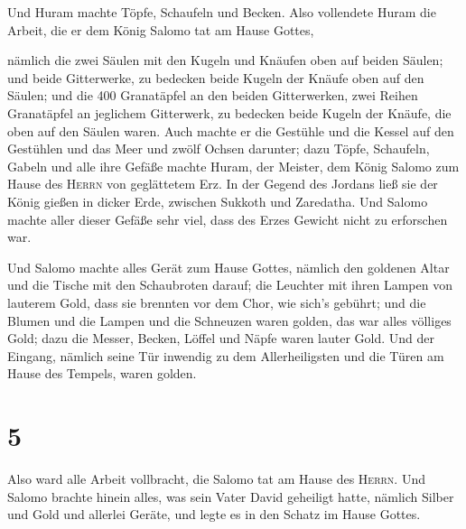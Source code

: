  Und Huram machte Töpfe, Schaufeln und Becken. Also
vollendete Huram die Arbeit, die er dem König Salomo tat am Hause
Gottes,

 nämlich die zwei Säulen mit den Kugeln und Knäufen oben
auf beiden Säulen; und beide Gitterwerke, zu bedecken beide Kugeln der
Knäufe oben auf den Säulen;  und die 400 Granatäpfel an
den beiden Gitterwerken, zwei Reihen Granatäpfel an jeglichem
Gitterwerk, zu bedecken beide Kugeln der Knäufe, die oben auf den Säulen
waren.  Auch machte er die Gestühle und die Kessel auf
den Gestühlen  und das Meer und zwölf Ochsen darunter;
 dazu Töpfe, Schaufeln, Gabeln und alle ihre Gefäße
machte Huram, der Meister, dem König Salomo zum Hause des \textsc{Herrn}
von geglättetem Erz.  In der Gegend des Jordans ließ sie
der König gießen in dicker Erde, zwischen Sukkoth und Zaredatha.
 Und Salomo machte aller dieser Gefäße sehr viel, dass
des Erzes Gewicht nicht zu erforschen war.

 Und Salomo machte alles Gerät zum Hause Gottes, nämlich
den goldenen Altar und die Tische mit den Schaubroten darauf;
 die Leuchter mit ihren Lampen von lauterem Gold, dass
sie brennten vor dem Chor, wie sich's gebührt;  und die
Blumen und die Lampen und die Schneuzen waren golden, das war alles
völliges Gold;  dazu die Messer, Becken, Löffel und Näpfe
waren lauter Gold. Und der Eingang, nämlich seine Tür inwendig zu dem
Allerheiligsten und die Türen am Hause des Tempels, waren golden.

\hypertarget{section-4}{%
\section{5}\label{section-4}}

 Also ward alle Arbeit vollbracht, die Salomo tat am Hause
des \textsc{Herrn}. Und Salomo brachte hinein alles, was sein Vater
David geheiligt hatte, nämlich Silber und Gold und allerlei Geräte, und
legte es in den Schatz im Hause Gottes.

